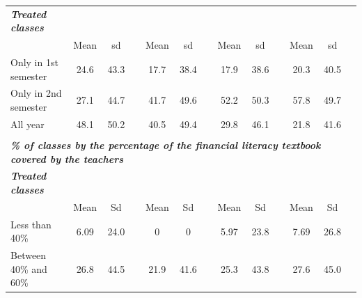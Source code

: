 \documentclass[
	article,			%
	12pt,				%
	oneside,			%
	a4paper,			%
	]{article}
\begin{document}
\begin{table}[h!]
\begin{tabular}{lcccccccccccc}
{\it {\bf Treated classes}} & {\it {\bf }} & {\it {\bf }} & {\it {\bf }} & {\it {\bf }} & {\it {\bf }} & {\it {\bf }} & {\it {\bf }} & {\it {\bf }} & {\it {\bf }} & {\it {\bf }} & {\it {\bf }} & {\it {\bf }} \\

{\it {\bf }} &       Mean &         sd &            &       Mean &         sd &            &       Mean &         sd &            &       Mean &         sd \\

Only in 1st semester &       24.6 &       43.3 &            &       17.7 &       38.4 &            &       17.9 &       38.6 &            &       20.3 &       40.5 \\

Only in 2nd semester &       27.1 &       44.7 &            &       41.7 &       49.6 &            &       52.2 &       50.3 &            &       57.8 &       49.7 \\

  All year &       48.1 &       50.2 &            &       40.5 &       49.4 &            &       29.8 &       46.1 &            &       21.8 &       41.6 \\


           &            &            &            &            &            &            &            &            &            &            &            &            \\
\hline
                                          \multicolumn{ 13}{l}{{\it {\bf \% of classes by the percentage of the financial literacy textbook covered by the teachers}}} \\

{\it {\bf Treated classes}} & {\it {\bf }} & {\it {\bf }} & {\it {\bf }} & {\it {\bf }} & {\it {\bf }} & {\it {\bf }} & {\it {\bf }} & {\it {\bf }} & {\it {\bf }} & {\it {\bf }} & {\it {\bf }} & {\it {\bf }} \\

{\it {\bf }} &       Mean &         Sd &            &       Mean &         Sd &            &       Mean &         Sd &            &       Mean &         Sd \\

Less than 40\% &       6.09 &       24.0 &            &          0 &          0 &            &       5.97 &       23.8 &            &       7.69 &       26.8 \\

Between 40\% and 60\% &       26.8 &       44.5 &            &       21.9 &       41.6 &            &       25.3 &       43.8 &            &       27.6 &       45.0 \\


\end{tabular}
\end{table}
\end{document}
